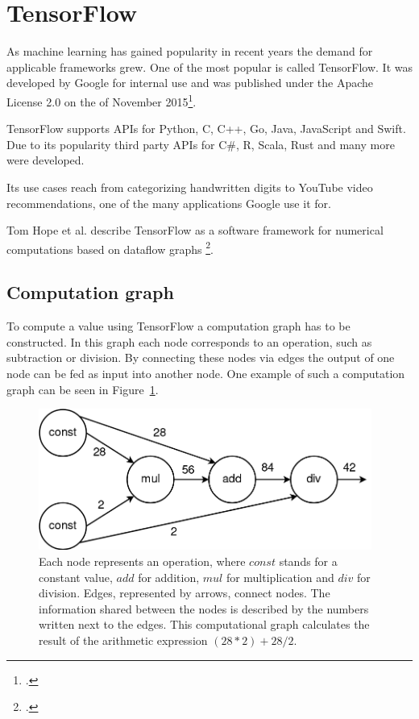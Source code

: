 \newpage

\section{TensorFlow}
As machine learning has gained popularity in recent years the demand for applicable frameworks grew. One of the most popular is called TensorFlow. It was developed by Google for internal use and was published under the Apache License 2.0 on the  of November 2015\footcite{Wikipedia_TensorFlow}.

TensorFlow supports APIs for Python, C, C++, Go, Java, JavaScript and Swift.
Due to its popularity third party APIs for C\#, R, Scala, Rust and many more were developed.

Its use cases reach from categorizing handwritten digits to YouTube video recommendations, one of the many applications Google use it for.

Tom Hope et al. describe TensorFlow as a software framework for numerical computations based on dataflow graphs \footcite[page 6]{Hope_Learning_TensorFlow}.

\subsection{Computation graph}
To compute a value using TensorFlow a computation graph has to be constructed. In this graph each node corresponds to an operation, such as subtraction or division. By connecting these nodes via edges the output of one node can be fed as input into another node. One example of such a computation graph can be seen in Figure~\ref{pic:methodology_tensorflow_computationGraph}.

\begin{figure}[h!]
	\centering
	\includegraphics[width=4.3in]{img/methodology_tensorflow_computationGraph.png}
	\caption{Each node represents an operation, where $const$ stands for a constant value, $add$ for addition, $mul$ for multiplication and $div$ for division. Edges, represented by arrows, connect nodes. The information shared between the nodes is described by the numbers written next to the edges. This computational graph calculates the result of the arithmetic expression $(28 * 2) + 28 / 2$.}
	\label{pic:methodology_tensorflow_computationGraph}
\end{figure}

